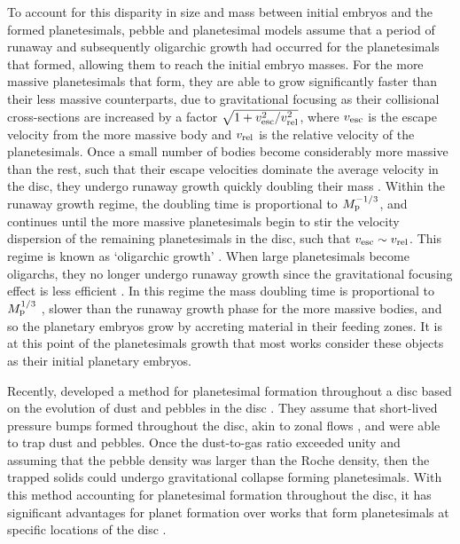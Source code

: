 \documentclass[a4paper,fleqn,usenatbib]{mnras}
\begin{document}
To account for this disparity in size and mass between initial embryos and the formed planetesimals, pebble and planetesimal models assume that a period of runaway and subsequently oligarchic growth had occurred for the planetesimals that formed, allowing them to reach the initial embryo masses.
For the more massive planetesimals that form, they are able to grow significantly faster than their less massive counterparts, due to gravitational focusing as their collisional cross-sections are increased by a factor $\sqrt{1+v_{\rm esc}^2/v_{\rm rel}^2}$, where $v_{\rm esc}$ is the escape velocity from the more massive body and $v_{\rm rel}$ is the relative velocity of the planetesimals.
Once a small number of bodies become considerably more massive than the rest, such that their escape velocities dominate the average velocity in the disc, they undergo runaway growth quickly doubling their mass \citep{Wetherill89,Wetherill93,Kokubo96}.
Within the runaway growth regime, the doubling time is proportional to $M_{\rm p}^{-1/3}$, and continues until the more massive planetesimals begin to stir the velocity dispersion of the remaining planetesimals in the disc, such that $v_{\rm esc} \sim v_{\rm rel}$.
This regime is known as `oligarchic growth' \citep{Kokubo98}.
When large planetesimals become oligarchs, they no longer undergo runaway growth since the gravitational focusing effect is less efficient \citep{Kokubo98}.
In this regime the mass doubling time is proportional to $M_{\rm p}^{1/3}$ , slower than the runaway growth phase for the more massive bodies, and so the planetary embryos grow by accreting material in their feeding zones.
It is at this point of the planetesimals growth that most works consider these objects as their initial planetary embryos.

Recently, \citet{Lenz19} developed a method for planetesimal formation throughout a disc based on the evolution of dust and pebbles in the disc \citep{Birnstiel10}.
They assume that short-lived pressure bumps formed throughout the disc, akin to zonal flows \citep{Johansen12,Dittrich13,Bai2014}, and were able to trap dust and pebbles.
Once the dust-to-gas ratio exceeded unity and assuming that the pebble density was larger than the Roche density, then the trapped solids could undergo gravitational collapse forming planetesimals.
With this method accounting for planetesimal formation throughout the disc, it has significant advantages for planet formation over works that form planetesimals at specific locations of the disc \citep[e.g. the water iceline:][]{Drazkowska17,Liu19}.
\end{document}
